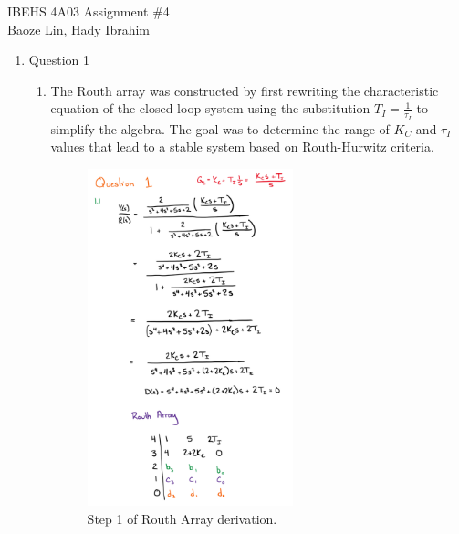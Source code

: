 \documentclass[12pt]{article}
\begin{document}
IBEHS 4A03 \hfill Assignment \#4\\
Baoze Lin, Hady Ibrahim

\hrulefill

\renewcommand{\theenumii}{\arabic{enumi}.\arabic{enumii}}

\begin{enumerate}
  \item Question 1
    \begin{enumerate}
    
      \item 
      The Routh array was constructed by first rewriting the characteristic equation of the closed-loop system using the substitution $T_I = \frac{1}{\tau_I}$ to simplify the algebra. The goal was to determine the range of $K_C$ and $\tau_I$ values that lead to a stable system based on Routh-Hurwitz criteria.
  
      \begin{figure}[H]
        \centering
        \includegraphics[width=0.6\textwidth]{Figures/figure1-1a.png}
        \caption{Step 1 of Routh Array derivation.}
      \end{figure}
  

\end{enumerate}
\end{enumerate}
\end{document}
